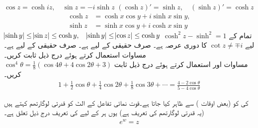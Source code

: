 \quad
$\cos z=\cosh iz,\quad \sin z=-i\sinh z$
\quad
$(\cosh z)'=\sinh z,\quad (\sinh z)'=\cosh z$
\quad
\begin{align*}
\cosh z&=\cosh x\cos y+i\sinh x\sin y,\\ 
\sinh z&=\sinh x\cos y+i\cosh x\sin y
\end{align*}
\quad
$\abs{\sinh y}\le \abs{\sin z}\le \cosh y,\quad \abs{\sinh y}\le \abs{\cos z}\le \cosh y$
\quad
$\cosh^2 z-\sinh^2=1$
\quad تمام  کے لیے 
$\cot z \ne \mp i$
\quad {} کا دوری عرصہ  ہے۔
\quad
{} صرف حقیقی  کے لیے ہے۔
\quad
{} صرف حقیقی  کے لیے ہے۔
\quad
مساوات  استعمال کرتے ہوئے درج ذیل ثابت کریں۔\\
$\cos^4 \theta=\frac{1}{8}(\cos 4\theta+4\cos 2\theta+3)$
\quad 
مساوات  اور  استعمال کرتے ہوئے درج ذیل ثابت کریں۔
\begin{align*}
1+\tfrac{1}{2}\cos \theta+\tfrac{1}{4}\cos 2\theta+\tfrac{1}{8}\cos 3\theta+\cdots=\frac{4-2\cos \theta}{5-4\cos \theta}
\end{align*}

 کی  کو  (بعض اوقات ) سے ظاہر کیا جاتا ہے۔قوت نمائی تفاعل کے الٹ کو قدرتی لوگارتھم کہتے ہیں (یہ قدرتی لوگارتھم کی تعریف ہے) یوں ہر  کے  لیے  کی تعریف درج ذیل تعلق ہے۔
\begin{align}\label{مساوات_مخلوط_لوگارتھم_الف}
e^w=z
\end{align}

